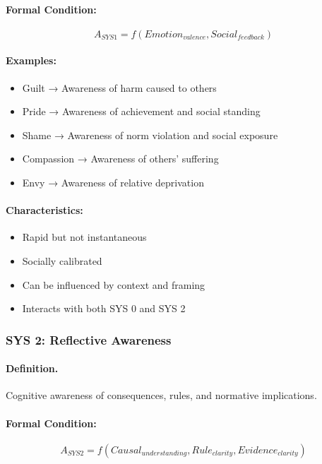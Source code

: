 \paragraph{Formal Condition:}
\begin{equation}
A_{SYS1} = f(Emotion_{valence}, Social_{feedback})
\end{equation}

\paragraph{Examples:}
\begin{itemize}
\item Guilt → Awareness of harm caused to others
\item Pride → Awareness of achievement and social standing
\item Shame → Awareness of norm violation and social exposure
\item Compassion → Awareness of others' suffering
\item Envy → Awareness of relative deprivation
\end{itemize}

\paragraph{Characteristics:}
\begin{itemize}
\item Rapid but not instantaneous
\item Socially calibrated
\item Can be influenced by context and framing
\item Interacts with both SYS 0 and SYS 2
\end{itemize}

\subsubsection{SYS 2: Reflective Awareness}

\paragraph{Definition.}
Cognitive awareness of consequences, rules, and normative implications.

\paragraph{Formal Condition:}
\begin{equation}
A_{SYS2} = f(Causal_{understanding}, Rule_{clarity}, Evidence_{clarity})
\end{equation}

